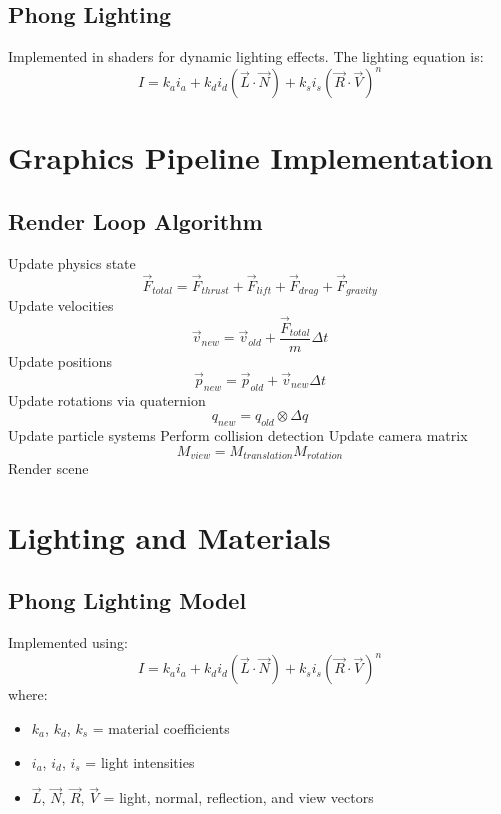 \documentclass{article}
\begin{document}
\subsection{Phong Lighting}
Implemented in shaders for dynamic lighting effects. The lighting equation is:
\begin{equation}
I = k_a i_a + k_d i_d(\vec{L}\cdot\vec{N}) + k_s i_s(\vec{R}\cdot\vec{V})^n
\end{equation}

\section{Graphics Pipeline Implementation}
\subsection{Render Loop Algorithm}
\begin{algorithmic}[1]
\STATE Update physics state
\begin{equation}
\vec{F}_{total} = \vec{F}_{thrust} + \vec{F}_{lift} + \vec{F}_{drag} + \vec{F}_{gravity}
\end{equation}
\STATE Update velocities
\begin{equation}
\vec{v}_{new} = \vec{v}_{old} + \frac{\vec{F}_{total}}{m}\Delta t
\end{equation}
\STATE Update positions
\begin{equation}
\vec{p}_{new} = \vec{p}_{old} + \vec{v}_{new}\Delta t
\end{equation}
\STATE Update rotations via quaternion
\begin{equation}
q_{new} = q_{old} \otimes \Delta q
\end{equation}
\STATE Update particle systems
\STATE Perform collision detection
\STATE Update camera matrix
\begin{equation}
M_{view} = M_{translation}M_{rotation}
\end{equation}
\STATE Render scene
\end{algorithmic}

\section{Lighting and Materials}

\subsection{Phong Lighting Model}
Implemented using:
\begin{equation}
I = k_a i_a + k_d i_d(\vec{L}\cdot\vec{N}) + k_s i_s(\vec{R}\cdot\vec{V})^n
\end{equation}
where:
\begin{itemize}
\item $k_a$, $k_d$, $k_s$ = material coefficients
\item $i_a$, $i_d$, $i_s$ = light intensities
\item $\vec{L}$, $\vec{N}$, $\vec{R}$, $\vec{V}$ = light, normal, reflection, and view vectors
\end{itemize}
\end{document}
